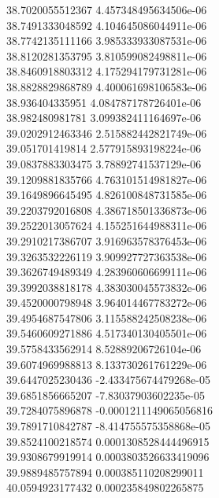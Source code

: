 {38.7020055512367 4.457348495634506e-06 \\
38.7491333048592 4.104645086044911e-06 \\
38.7742135111166 3.985333933087531e-06 \\
38.8120281353795 3.810599082498811e-06 \\
38.8460918803312 4.175294179731281e-06 \\
38.8828829868789 4.400061698106583e-06 \\
38.936404335951 4.084787178726401e-06 \\
38.982480981781 3.099382411164697e-06 \\
39.0202912463346 2.515882442821749e-06 \\
39.051701419814 2.577915893198224e-06 \\
39.0837883303475 3.78892741537129e-06 \\
39.1209881835766 4.763101514981827e-06 \\
39.1649896645495 4.826100848731585e-06 \\
39.2203792016808 4.386718501336873e-06 \\
39.2522013057624 4.155251644988311e-06 \\
39.2910217386707 3.916963578376453e-06 \\
39.3263532226119 3.909927727363538e-06 \\
39.3626749489349 4.283960606699111e-06 \\
39.3992038818178 4.383030045573832e-06 \\
39.4520000798948 3.964014467783272e-06 \\
39.4954687547806 3.115588242508238e-06 \\
39.5460609271886 4.517340130405501e-06 \\
39.5758433562914 8.52889206726104e-06 \\
39.6074969988813 8.133730261761229e-06 \\
39.6447025230436 -2.433475674479268e-05 \\
39.6851856665207 -7.83037903602235e-05 \\
39.7284075896878 -0.0001211149065056816 \\
39.7891710842787 -8.414755575358868e-05 \\
39.8524100218574 0.0001308528444496915 \\
39.9308679919914 0.0003803526633419096 \\
39.9889485757894 0.000385110208299011 \\
40.0594923177432 0.000235849802265875 \\
}
